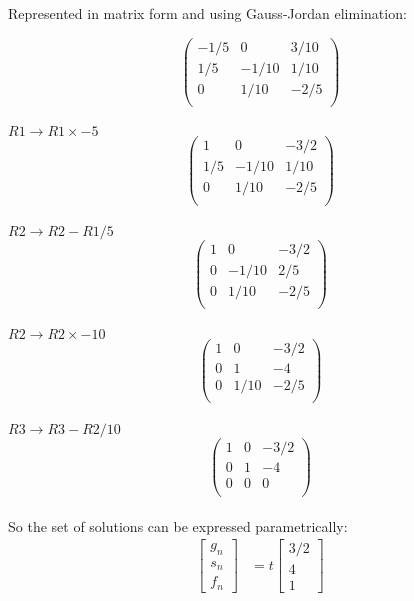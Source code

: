 \documentclass[12pt,a4paper]{report}
\begin{document}
Represented in matrix form and using Gauss-Jordan elimination:

 \[
 \left(\begin{array}{rrr}
 -1/5 & 0 & 3/10     \\
 1/5 & -1/10 & 1/10 \\
 0 & 1/10 & -2/5  \\
    \end{array} \right)
\] \\

\(R1 \rightarrow R1 \times -5 \)
  \[
 \left(\begin{array}{rrr}
 1 & 0 & -3/2         \\
 1/5 & -1/10 & 1/10 \\
 0 & 1/10 & -2/5 \\
    \end{array} \right)
\] \\

\(R2 \rightarrow R2 -R1 / 5 \)
  \[
 \left(\begin{array}{rrr}
 1 & 0 & -3/2 \\
 0 & -1/10 & 2/5 \\
 0 & 1/10 & -2/5 \\
    \end{array} \right)
\] \\

\(R2 \rightarrow R2 \times -10 \)
  \[
 \left(\begin{array}{rrr}
 1 & 0 & -3/2 \\
 0 & 1 & -4     \\
 0 & 1/10 & -2/5 \\
    \end{array} \right)
\] \\

\(R3 \rightarrow R3 -R2 / 10 \)
 \[
 \left(\begin{array}{rrr}
 1 & 0 & -3/2 \\
 0 & 1 & -4 \\
 0 & 0 & 0      \\
   \end{array} \right)
\] \\

So the set of solutions can be expressed parametrically:
\begin{align*}
\begin{bmatrix}g_n\\s_n\\f_n\end{bmatrix} &= t \begin{bmatrix}3/2\\4\\1\end{bmatrix}
\end{align*} 
\end{document}
